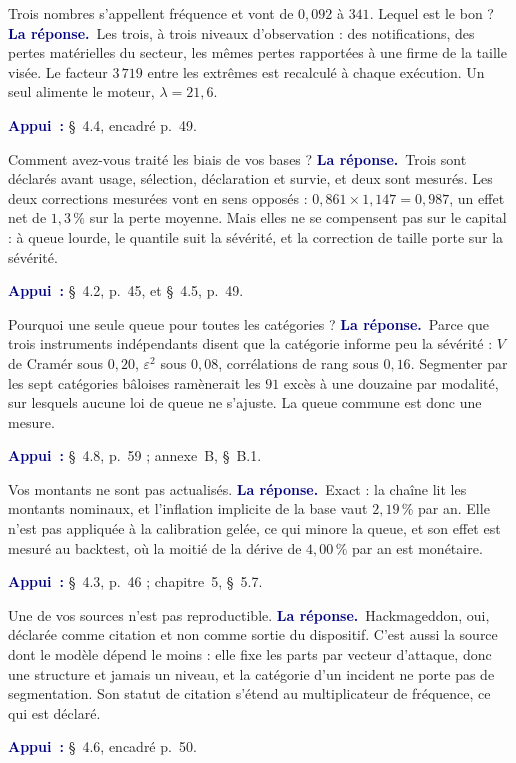 \documentclass[11pt,a4paper]{article}
\newcommand{\rep}[1]{\smallskip\noindent\textcolor{navy}{\textbf{La réponse.}}\ #1\par}
\newcommand{\appui}[1]{\smallskip\noindent\small\textcolor{navy}{\textbf{Appui~:}} #1\par\normalsize}
\begin{document}
\begin{question}{\og Trois nombres s'appellent fréquence et vont de $0{,}092$ à $341$. Lequel est le bon ?\fg{}}
\rep{Les trois, à trois niveaux d'observation : des notifications, des pertes matérielles du
secteur, les mêmes pertes rapportées à une firme de la taille visée. Le facteur $3\,719$ entre les
extrêmes est recalculé à chaque exécution. Un seul alimente le moteur, $\lambda=21{,}6$.}
\appui{\S~4.4, encadré p.~49.}
\end{question}

\begin{question}{\og Comment avez-vous traité les biais de vos bases ?\fg{}}
\rep{Trois sont déclarés avant usage, sélection, déclaration et survie, et deux sont mesurés.
Les deux corrections mesurées vont en sens opposés : $0{,}861\times1{,}147=0{,}987$, un effet net
de $1{,}3\,\%$ sur la perte moyenne. Mais elles ne se compensent pas sur le capital : à queue
lourde, le quantile suit la sévérité, et la correction de taille porte sur la sévérité.}
\appui{\S~4.2, p.~45, et \S~4.5, p.~49.}
\end{question}

\begin{question}{\og Pourquoi une seule queue pour toutes les catégories ?\fg{}}
\rep{Parce que trois instruments indépendants disent que la catégorie informe peu la sévérité :
$V$ de Cramér sous $0{,}20$, $\varepsilon^2$ sous $0{,}08$, corrélations de rang sous $0{,}16$.
Segmenter par les sept catégories bâloises ramènerait les $91$ excès à une douzaine par modalité,
sur lesquels aucune loi de queue ne s'ajuste. La queue commune est donc une mesure.}
\appui{\S~4.8, p.~59 ; annexe~B, \S~B.1.}
\end{question}

\begin{question}{\og Vos montants ne sont pas actualisés.\fg{}}
\rep{Exact : la chaîne lit les montants nominaux, et l'inflation implicite de la base vaut
$2{,}19\,\%$ par an. Elle n'est pas appliquée à la calibration gelée, ce qui minore la queue, et
son effet est mesuré au backtest, où la moitié de la dérive de $4{,}00\,\%$ par an est monétaire.}
\appui{\S~4.3, p.~46 ; chapitre~5, \S~5.7.}
\end{question}

\begin{question}{\og Une de vos sources n'est pas reproductible.\fg{}}
\rep{Hackmageddon, oui, déclarée comme citation et non comme sortie du dispositif. C'est aussi
la source dont le modèle dépend le moins : elle fixe les parts par vecteur d'attaque, donc une
structure et jamais un niveau, et la catégorie d'un incident ne porte pas de segmentation. Son
statut de citation s'étend au multiplicateur de fréquence, ce qui est déclaré.}
\appui{\S~4.6, encadré p.~50.}
\end{question}
\end{document}
